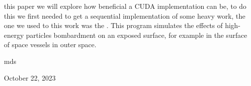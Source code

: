 \documentclass[10pt,journal,compsoc]{IEEEtran}
\begin{document}




% 
% 
% 
% 
 this paper we will explore how beneficial a CUDA implementation can be, to do this we first needed to get a sequential implementation of some heavy work, the one we used to this work was the \cite{WinNT2}. This program simulates the effects of high-energy particles bombardment on an exposed surface, for example in the surface of space vessels in outer space.

\hfill mds
 
\hfill October 22, 2023

\end{document}
